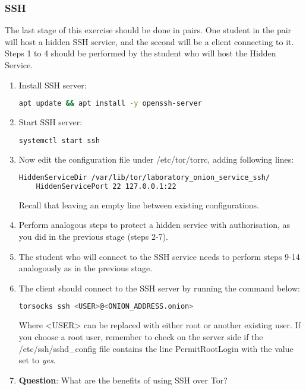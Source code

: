 \subsubsection{SSH}
The last stage of this exercise should be done in pairs. One student in the pair will host a hidden SSH service, and the second will be a client connecting to it. Steps 1 to 4 should be performed by the student who will host the Hidden Service.

\begin{enumerate}
    \item Install SSH server:
    \begin{lstlisting}[language=bash]
    apt update && apt install -y openssh-server
    \end{lstlisting}
    \item Start SSH server:
    \begin{lstlisting}[language=bash]
    systemctl start ssh
    \end{lstlisting}
    \item Now edit the configuration file under /etc/tor/torrc, adding following lines:
    \begin{lstlisting}[language=bash]
    HiddenServiceDir /var/lib/tor/laboratory_onion_service_ssh/
    HiddenServicePort 22 127.0.0.1:22
    \end{lstlisting}
    Recall that leaving an empty line between existing configurations.
    \item Perform analogous steps to protect a hidden service with authorisation, as you did in the previous stage (steps 2-7).
    \item The student who will connect to the SSH service needs to perform steps 9-14 analogously as in the previous stage.
    \item The client should connect to the SSH server by running the command below:
    \begin{lstlisting}[language=bash]
    torsocks ssh <USER>@<ONION_ADDRESS.onion>
    \end{lstlisting}
    Where <USER> can be replaced with either root or another existing user. If you choose a root user, remember to check on the server side if the /etc/ssh/sshd\_config file contains the line PermitRootLogin with the value set to \textit{yes}.
    \item \textbf{Question}: What are the benefits of using SSH over Tor?
\end{enumerate}

